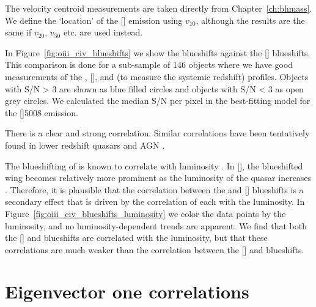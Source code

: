 The  velocity centroid measurements are taken directly from Chapter~\ref{ch:bhmass}. 
We define the `location' of the [] emission using $v_{10}$, although the results are the same if $v_{20}$, $v_{50}$ etc. are used instead.

In Figure~\ref{fig:oiii_civ_blueshifts} we show the  blueshifts against the [] blueshifts.
This comparison is done for a sub-sample of 146 objects where we have good measurements of the , [], and \hb (to measure the systemic redshift) profiles. 
Objects with S/N > 3 are shown as blue filled circles and objects with S/N < 3 as open grey circles. 
We calculated the median S/N per pixel in the best-fitting model for the []5008 emission.

There is a clear and strong correlation. 
Similar correlations have been tentatively found in lower redshift quasars and AGN \citep{zamanov02}. 


The blueshifting of  is known to correlate with luminosity \citep{richards11}.
In [], the blueshifted wing becomes relatively more prominent as the luminosity of the quasar increases \citep{shen14}. 
Therefore, it is plausible that the correlation between the  and [] blueshifts is a secondary effect that is driven by the correlation of each with the luminosity. 
In Figure~\ref{fig:oiii_civ_blueshifts_luminosity} we color the data points by the luminosity, and no luminosity-dependent trends are apparent. 
We find that both the [] and  blueshifts are correlated with the luminosity, but that these correlations are much weaker than the correlation between the [] and  blueshifts. 



\section{Eigenvector one correlations}

